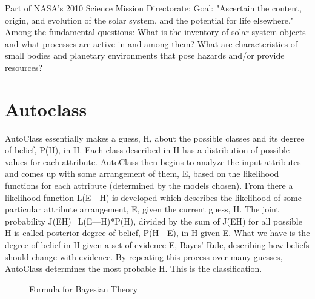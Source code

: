 \documentclass[thesis]{RyanPoster}
\begin{document}
\begin{poster}
Part of NASA's 2010 Science Mission Directorate:
Goal: "Ascertain the content, origin, and evolution of the solar system, and the potential for life elsewhere."
Among the fundamental questions:
What is the inventory of solar system objects and what processes are active in and among them?
What are characteristics of small bodies and planetary environments that pose hazards and/or provide resources?

\section{Autoclass}%
AutoClass essentially makes a guess, H, about the
possible classes and its degree of belief, P(H), in H. 
Each class described in H has a distribution of possible values for each attribute. AutoClass then begins to analyze the input attributes and comes up with some arrangement of them, E, based on the likelihood functions for each attribute (determined by the models chosen). From there a likelihood function L(E—H) is developed which describes the likelihood of some particular attribute arrangement, E,
given the current guess, H. The joint probability
J(EH)=L(E—H)*P(H), divided by the sum of J(EH)
for all possible H is called posterior degree of belief,
P(H—E), in H given E. What we have is the degree
of belief in H given a set of evidence E, Bayes’ Rule,
describing how beliefs should change with evidence.
By repeating this process over many guesses, AutoClass determines the most probable H. This is the
classification.

\begin{figure}
\begin{center}
\caption{Formula for Bayesian Theory}%
\end{center}
\end{figure}

\vfill
\columnbreak

\end{poster}
\end{document}
